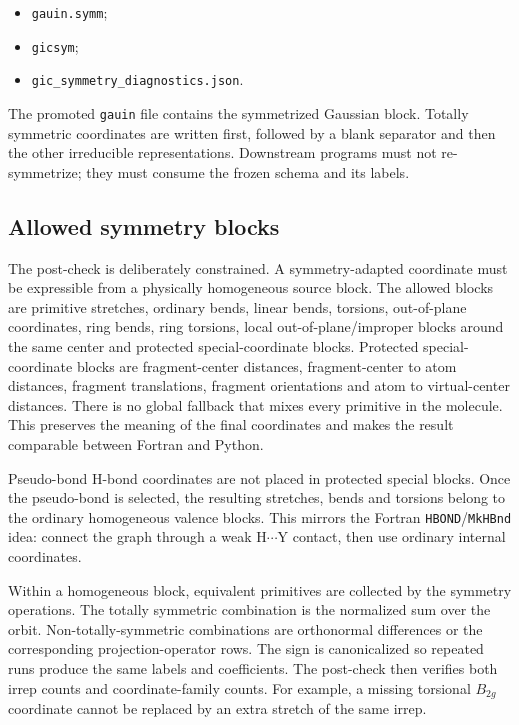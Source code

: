 \documentclass[11pt]{article}
\newcommand{\gauin}{\texttt{gauin}}
\begin{document}
\begin{itemize}
  \item \texttt{gauin.symm};
  \item \texttt{gicsym};
  \item \texttt{gic\_symmetry\_diagnostics.json}.
\end{itemize}

\noindent
The promoted \gauin{} file contains the symmetrized Gaussian block.  Totally
symmetric coordinates are written first, followed by a blank separator and then
the other irreducible representations.  Downstream programs must not
re-symmetrize; they must consume the frozen schema and its labels.

\subsection{Allowed symmetry blocks}

The post-check is deliberately constrained.  A symmetry-adapted coordinate must
be expressible from a physically homogeneous source block.  The allowed blocks
are primitive stretches, ordinary bends, linear bends, torsions, out-of-plane
coordinates, ring bends, ring torsions, local out-of-plane/improper blocks
around the same center and protected special-coordinate blocks.  Protected
special-coordinate blocks are fragment-center distances, fragment-center to atom
distances, fragment translations, fragment orientations and atom to
virtual-center distances.  There is no global fallback that mixes every
primitive in the molecule.  This preserves the meaning of the final coordinates
and makes the result comparable between Fortran and Python.

Pseudo-bond H-bond coordinates are not placed in protected special blocks.  Once
the pseudo-bond is selected, the resulting stretches, bends and torsions belong
to the ordinary homogeneous valence blocks.  This mirrors the Fortran
\texttt{HBOND}/\texttt{MkHBnd} idea: connect the graph through a weak
H\(\cdots\)Y contact, then use ordinary internal coordinates.

Within a homogeneous block, equivalent primitives are collected by the symmetry
operations.  The totally symmetric combination is the normalized sum over the
orbit.  Non-totally-symmetric combinations are orthonormal differences or the
corresponding projection-operator rows.  The sign is canonicalized so repeated
runs produce the same labels and coefficients.  The post-check then verifies
both irrep counts and coordinate-family counts.  For example, a missing
torsional \(B_{2g}\) coordinate cannot be replaced by an extra stretch of the
same irrep.
\end{document}
